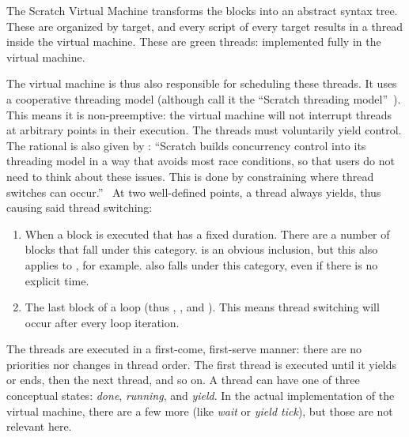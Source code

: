 \documentclass[../main]{subfiles}
\begin{document}
The Scratch Virtual Machine transforms the blocks into an abstract syntax tree.
These are organized by target, and every script of every target results in a thread inside the virtual machine.
These are green threads: implemented fully in the virtual machine.

The virtual machine is thus also responsible for scheduling these threads.
It uses a cooperative threading model (although \citeauthor{maloneyScratchProgrammingLanguage2010a} call it the ``Scratch threading model''~\autocite{maloneyScratchProgrammingLanguage2010a}).
This means it is non-preemptive: the virtual machine will not interrupt threads at arbitrary points in their execution.
The threads must voluntarily yield control.
The rational is also given by \citeauthor{maloneyScratchProgrammingLanguage2010a}: ``Scratch builds concurrency control into its threading model in a way that avoids most race conditions, so that users do not need to think about these issues.
This is done by constraining where thread switches can occur.''~\autocite{maloneyScratchProgrammingLanguage2010a}
At two well-defined points, a thread always yields, thus causing said thread switching:

\begin{enumerate}
    \item When a block is executed that has a fixed duration.
        There are a number of blocks that fall under this category.
         is an obvious inclusion, but this also applies to , for example.
         also falls under this category, even if there is no explicit time.
    \item The last block of a loop (thus , , and ).
        This means thread switching will occur after every loop iteration.
\end{enumerate}

The threads are executed in a first-come, first-serve manner: there are no priorities nor changes in thread order.
The first thread is executed until it yields or ends, then the next thread, and so on.
A thread can have one of three conceptual states: \emph{done}, \emph{running}, and \emph{yield}.
In the actual implementation of the virtual machine, there are a few more (like \emph{wait} or \emph{yield tick}), but those are not relevant here.
\end{document}
